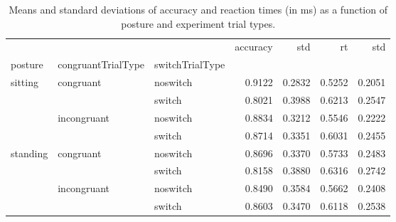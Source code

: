\begin{table}
\centering
\caption{Means and standard deviations of accuracy and reaction times (in ms) as a function of posture and experiment trial types.}
\label{table-task-switching-replication-reaction-time}
\begin{tabular}{lllrrrr}
\toprule
         &             &        & accuracy &    std &     rt &    std \\
posture & congruantTrialType & switchTrialType &          &        &        &        \\
\midrule
sitting & congruant & noswitch &   0.9122 & 0.2832 & 0.5252 & 0.2051 \\
         &             & switch &   0.8021 & 0.3988 & 0.6213 & 0.2547 \\
         & incongruant & noswitch &   0.8834 & 0.3212 & 0.5546 & 0.2222 \\
         &             & switch &   0.8714 & 0.3351 & 0.6031 & 0.2455 \\
standing & congruant & noswitch &   0.8696 & 0.3370 & 0.5733 & 0.2483 \\
         &             & switch &   0.8158 & 0.3880 & 0.6316 & 0.2742 \\
         & incongruant & noswitch &   0.8490 & 0.3584 & 0.5662 & 0.2408 \\
         &             & switch &   0.8603 & 0.3470 & 0.6118 & 0.2538 \\
\bottomrule
\end{tabular}
\end{table}
